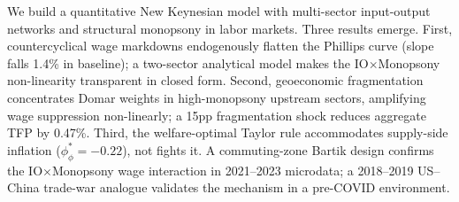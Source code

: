 We build a quantitative New Keynesian model with multi-sector input-output
networks and structural monopsony in labor markets. Three results emerge.
First, countercyclical wage markdowns endogenously flatten the Phillips curve
(slope falls 1.4\% in baseline); a two-sector analytical model makes the
IO$\times$Monopsony non-linearity transparent in closed form. Second,
geoeconomic fragmentation concentrates Domar weights in high-monopsony
upstream sectors, amplifying wage suppression non-linearly; a 15pp
fragmentation shock reduces aggregate TFP by 0.47\%. Third, the
welfare-optimal Taylor rule accommodates supply-side inflation
($\phi_\phi^* = -0.22$), not fights it. A commuting-zone Bartik design
confirms the IO$\times$Monopsony wage interaction in 2021--2023 microdata;
a 2018--2019 US--China trade-war analogue validates the mechanism in a
pre-COVID environment.
